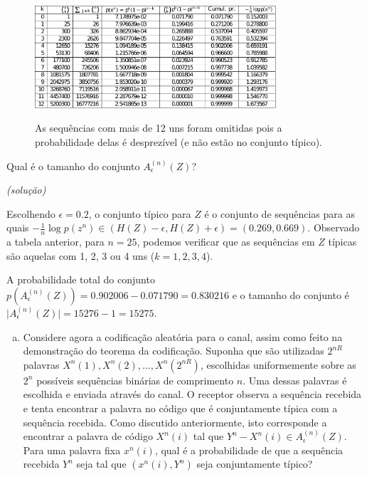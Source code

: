 \begin{frame}[allowframebreaks]
\begin{exercise}
  \examplebreak

  \begin{figure}[h!]
  \centering
  \includegraphics[width=0.8\textwidth]{images/tabex715.pdf}
  \label{fig:tabex715}
  \caption{As sequências com mais de 12 uns foram omitidas pois a probabilidade delas
  é desprezível (e não estão no conjunto típico).}
  \end{figure}

  \examplebreak
  Qual é o tamanho do conjunto $A_{\epsilon}^{(n)}(Z)$? 

  \textit{(solução)}

  Escolhendo $\epsilon = 0.2$, o conjunto típico para $Z$ é o conjunto de sequências para as quais
  $-\frac{1}{n} \log p(z^n) \in \left( H(Z) - \epsilon, H(Z) + \epsilon \right) = (0.269,0.669)$.
  Observado a tabela anterior, para $n=25$, podemos verificar que as sequências em $Z$ típicas 
  são aquelas com 1, 2, 3 ou 4 uns ($k=1,2,3,4$).

  A probabilidade total do conjunto $p( A_{\epsilon}^{(n)}(Z)) = 0.902006 - 0.071790 = 0.830216$
  e o tamanho do conjunto é $\vert A_{\epsilon}^{(n)}(Z) \vert = 15276 - 1 = 15275$. 



  \examplebreak
  \begin{enumerate}[e)]
  \item Considere agora a codificação aleatória para o canal, assim como feito na demonstração
  do teorema da codificação. Suponha que são utilizadas $2^{nR}$ palavras 
  $X^n(1), X^n(2), \ldots, X^n(2^{nR})$, escolhidas uniformemente sobre as $2^n$ possíveis
  sequências binárias de comprimento $n$. Uma dessas palavras é escolhida e enviada através
  do canal. O receptor observa a sequência recebida e tenta encontrar a palavra no código
  que é conjuntamente típica com a sequência recebida. Como discutido anteriormente, 
  isto corresponde a encontrar a palavra de código $X^n(i)$ tal que 
  $Y^n - X^n(i) \in A_{\epsilon}^{(n)}(Z)$. Para uma palavra fixa $x^n(i)$, qual é a probabilidade
  de que a sequência recebida $Y^n$ seja tal que $(x^n(i), Y^n)$ seja conjuntamente típico?
  \end{enumerate}


\end{exercise}
\end{frame}
